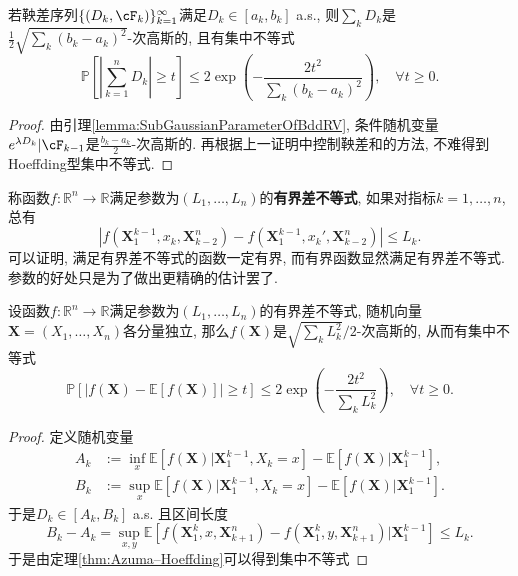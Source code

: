 \begin{theorem}\label{thm:Azuma–Hoeffding}
	若鞅差序列$\{(D_k, \cF_k)\}_{k=1}^{\infty}$满足$D_k \in [a_k, b_k]$ a.s., 则$\sum_k D_k$是$\frac{1}{2}\sqrt{\sum_k (b_k - a_k)^2}$-次高斯的, 且有集中不等式
	\begin{equation*}
		\mathbb{P} \left[ \left| \sum_{k=1}^n D_k \right| \geq t \right]
		\leq 2 \exp \left(- \frac{2 t^2}{\sum_k (b_k - a_k)^2} \right), 
		\quad \forall t \geq 0. 
	\end{equation*}	
\end{theorem}
\begin{proof}
	由引理\ref{lemma:SubGaussianParameterOfBddRV}, 条件随机变量$e^{\lambda D_k} | \cF_{k-1}$是$\frac{b_k - a_k}{2}$-次高斯的. 
	再根据上一证明中控制鞅差和的方法, 不难得到Hoeffding型集中不等式. 
\end{proof}

称函数$f \colon \mathbb{R}^n \to \mathbb{R}$满足参数为$(L_1, \dots, L_n)$的\textbf{有界差不等式}, 如果对指标$k = 1, \dots, n$, 总有
\begin{equation*}
	|f(\bm{X}_1^{k-1}, x_k, \bm{X}_{k-2}^n) - f(\bm{X}_1^{k-1}, x_k', \bm{X}_{k-2}^n)| 
	\leq L_k. 
\end{equation*}
可以证明, 满足有界差不等式的函数一定有界, 而有界函数显然满足有界差不等式. 
参数的好处只是为了做出更精确的估计罢了. 

\begin{corollary}[有界差不等式]\label{cor:BddDiffIneq}
	设函数$f \colon \mathbb{R}^n \to \mathbb{R}$满足参数为$(L_1, \dots, L_n)$的有界差不等式, 随机向量$\bm{X} = (X_1, \dots, X_n)$各分量独立, 那么$f(\bm{X})$是$\sqrt{\sum_k L_k^2} / 2$-次高斯的, 从而有集中不等式
	\begin{equation}
		\mathbb{P}[|f(\bm{X}) - \mathbb{E}[f(\bm{X})]| \geq t] 
		\leq 2 \exp\left( - \frac{2 t^2}{\sum_k L_k^2} \right), 
		\quad \forall t \geq 0. 
	\end{equation}
\end{corollary}
\begin{proof}
	定义随机变量 
	\begin{align*}
		A_k &:= \inf_x \mathbb{E}[f(\bm{X})|\bm{X}_1^{k-1}, X_k = x] - \mathbb{E}[f(\bm{X})|\bm{X}_1^{k-1}], \\
		B_k &:= \sup_x \mathbb{E}[f(\bm{X})|\bm{X}_1^{k-1}, X_k = x] - \mathbb{E}[f(\bm{X})|\bm{X}_1^{k-1}]. 
	\end{align*} 
	于是$D_k \in [A_k, B_k]$ a.s. 且区间长度
	\begin{equation*}
		B_k - A_k
		= \sup_{x, y} \mathbb{E}[f(\bm{X}_1^k, x, \bm{X}_{k+1}^n) - f(\bm{X}_1^k, y, \bm{X}_{k+1}^n) | \bm{X}_1^{k-1}] 
		\leq L_k. 
	\end{equation*}
	于是由定理\ref{thm:Azuma–Hoeffding}可以得到集中不等式
\end{proof}

